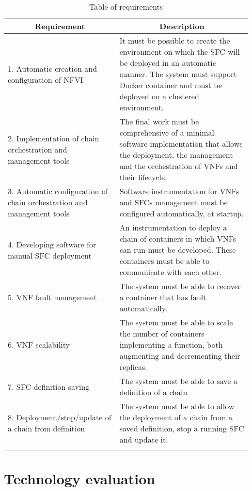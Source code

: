 \begin{longtable}[c]{p{}p{}}
\hline
\multicolumn{1}{c}{\textbf{Requirement}}                                & \multicolumn{1}{c}{\textbf{Description}}                                                                                                                                                       \\ \hline
\endhead
%
\hline
\endfoot
%
\endlastfoot
%
1. Automatic creation and configuration of NFVI &
It must be possible to create the environment on which the SFC will be deployed
in an automatic manner. The system must support Docker container and must be
deployed on a clustered environment. \\
2. Implementation of chain orchestration and management tools &
The final work must be comprehensive of a minimal software implementation that
allows the deployment, the management and the orchestration of VNFs and their
lifecycle. \\
3. Automatic configuration of chain orchestration and management tools &
Software instrumentation for VNFs and SFCs management must be configured
automatically, at startup. \\
4. Developing software for manual SFC deployment &
An instrumentation to deploy a chain of containers in which VNFs can run must
be developed. These containers must be able to communicate with each
other. \\
5. VNF fault management &
The system must be able to recover a container that has fault automatically. \\
6. VNF scalability &
The system must be able to scale the number of containers implementing a
function, both augmenting and decrementing their replicas. \\
7. SFC definition saving &
The system must be able to save a definition of a chain \\
8. Deployment/stop/update of a chain from definition &
The system must be able to allow the deployment of a chain from a saved
definition, stop a running SFC and update it. \\
\hline
\caption{Table of requirements}
\label{chap:prjan:tab:req}\\
\end{longtable}

\section{Technology evaluation}


